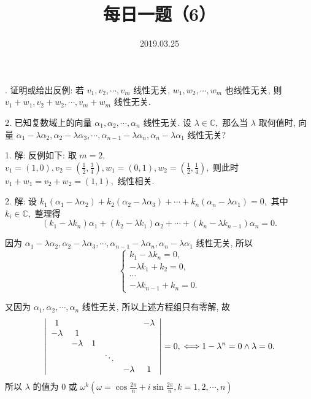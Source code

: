 \documentclass[UTF8]{ctexart}
\title{\textbf{每日一题（6）}}
\date{2019.03.25}
\begin{document}
. 证明或给出反例: 若 $v_1,v_2,\cdots,v_m$ 线性无关,  $w_1,w_2,\cdots,w_m$ 也线性无关, 则 $v_1+w_1,v_2+w_2,\cdots,v_m+w_m$ 线性无关.

2. 已知复数域上的向量 $\alpha_1,\alpha_2,\cdots,\alpha_n$ 线性无关. 设 $\lambda\in\mathbb{C},$ 那么当 $\lambda$ 取何值时, 向量 $\alpha_1-\lambda\alpha_2,\alpha_2-\lambda\alpha_3,\cdots,\alpha_{n-1}-\lambda\alpha_n,\alpha_n-\lambda\alpha_1$ 线性无关?

1. 解: 反例如下: 取 $m=2,$ $v_1=(1,0),v_2=\left(\displaystyle\frac{1}{2},\displaystyle\frac{3}{4}\right),w_1=(0,1),w_2=\left(\displaystyle\frac{1}{2},\displaystyle\frac{1}{4}\right),$ 则此时 $v_1+w_1=v_2+w_2=(1,1),$ 线性相关.

2. 解: 设 $k_1(\alpha_1-\lambda\alpha_2)+k_2(\alpha_2-\lambda\alpha_3)+\cdots+k_n(\alpha_n-\lambda\alpha_1)=0,$ 其中 $k_i \in \mathbb{C},$ 整理得
\[(k_1-\lambda k_n)\alpha_1+(k_2-\lambda k_1)\alpha_2+\cdots+(k_n-\lambda k_{n-1})\alpha_n=0.\]

因为 $\alpha_1-\lambda\alpha_2,\alpha_2-\lambda\alpha_3,\cdots,\alpha_{n-1}-\lambda\alpha_n,\alpha_n-\lambda\alpha_1$ 线性无关, 所以
\[
\begin{cases}
   k_1-\lambda k_n=0, \\
   -\lambda k_1+k_2=0, \\
   \cdots  \\
   -\lambda k_{n-1}+k_n=0.
\end{cases} 
\]

又因为 $\alpha_1,\alpha_2,\cdots,\alpha_n$ 线性无关, 所以上述方程组只有零解, 故
\[\left|
\begin{array}{cccccc}
  1 &   &   &   &   & -\lambda \\
  -\lambda & 1 &   &   &   &   \\
    & -\lambda & 1 &   &   &   \\
    &   &   & \ddots &   &    \\
    &   &   &   & -\lambda & 1
\end{array}\right|=0,\\
\Longleftrightarrow 1-\lambda^n=0\wedge\lambda=0.
\]
所以 $\lambda$ 的值为 $0$ 或 $\omega^k(\omega=\cos\displaystyle\frac{2\pi}{n}+i\sin\displaystyle\frac{2\pi}{n},k=1,2,\cdots,n)$
\end{document}
